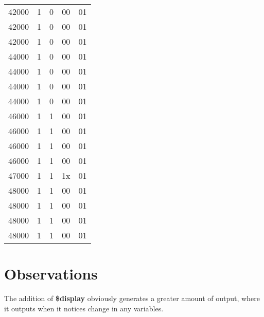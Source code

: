 \documentclass[paper=usletter, fontsize=12pt]{article}
\begin{document}
\begin{longtable*}{@{\extracolsep{\fill}} ccccc}
        42000 & 1 & 0 & 00 & 01 \\
        42000 & 1 & 0 & 00 & 01 \\
        42000 & 1 & 0 & 00 & 01 \\
        44000 & 1 & 0 & 00 & 01 \\
        44000 & 1 & 0 & 00 & 01 \\
        44000 & 1 & 0 & 00 & 01 \\
        44000 & 1 & 0 & 00 & 01 \\
        46000 & 1 & 1 & 00 & 01 \\
        46000 & 1 & 1 & 00 & 01 \\
        46000 & 1 & 1 & 00 & 01 \\
        46000 & 1 & 1 & 00 & 01 \\
        47000 & 1 & 1 & 1x & 01 \\
        48000 & 1 & 1 & 00 & 01 \\
        48000 & 1 & 1 & 00 & 01 \\
        48000 & 1 & 1 & 00 & 01 \\
        48000 & 1 & 1 & 00 & 01 \\
    \end{longtable*}

    \section{Observations}
    The addition of \textbf{\$display} obviously generates a greater amount of output, where it outputs when it notices change in any variables.
\end{document}
